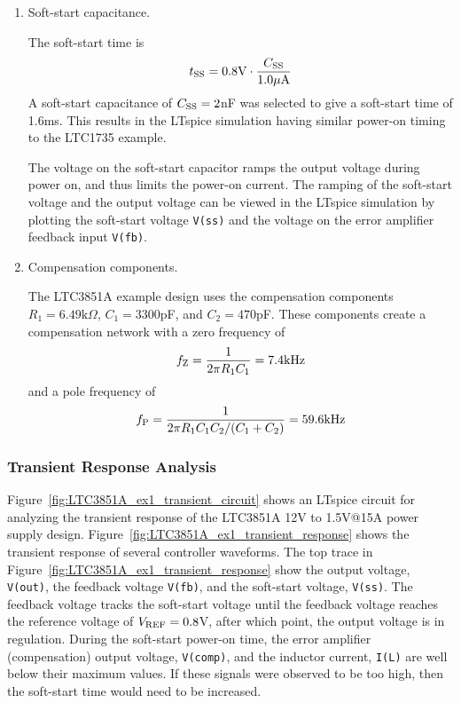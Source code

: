 \begin{enumerate}
\item Soft-start capacitance.

The soft-start time is 
%
\begin{equation}
t_{\rm SS} = 0.8\text{V}\cdot\frac{C_{\rm SS}}{1.0\mu\text{A}}
\end{equation}
%
A soft-start capacitance of $C_{\rm SS} = 2$nF was selected 
to give a soft-start time of 1.6ms. This results in the 
LTspice simulation having similar power-on timing to the
LTC1735 example.

The voltage on the soft-start capacitor ramps the output voltage
during power on, and thus limits the power-on current.
The ramping of the soft-start voltage and the output voltage
can be viewed in the LTspice simulation by plotting the
soft-start voltage \verb+V(ss)+ and the voltage on the
error amplifier feedback input \verb+V(fb)+.

\item Compensation components.

The LTC3851A example design uses the compensation components
$R_1  = 6.49\text{k}\Omega$, $C_1 = 3300$pF, and
$C_2 = 470$pF. These components create a compensation
network with a zero frequency of
%
\begin{equation}
f_{\rm Z} = \frac{1}{2\pi R_1 C_1} = 7.4\text{kHz}
\end{equation}
%
and a pole frequency of
%
\begin{equation}
f_{\rm P} = \frac{1}{2\pi R_1 C_1C_2/(C_1+C_2)}
= 59.6\text{kHz}
\end{equation}
\end{enumerate}

\clearpage
\subsubsection{Transient Response Analysis}

Figure~\ref{fig:LTC3851A_ex1_transient_circuit} shows an LTspice
circuit for analyzing the transient response of the
LTC3851A 12V to 1.5V@15A power supply design.
Figure~\ref{fig:LTC3851A_ex1_transient_response} shows the transient
response of several controller waveforms. 
The top trace in Figure~\ref{fig:LTC3851A_ex1_transient_response}
show the output voltage, \verb+V(out)+, the feedback voltage
\verb+V(fb)+, and the soft-start voltage, \verb+V(ss)+. The
feedback voltage tracks the soft-start voltage until the
feedback voltage reaches the reference voltage of 
$V_{\rm REF} = 0.8$V, after which point, the output voltage is
in regulation. During the soft-start power-on time, the
error amplifier (compensation) output voltage, \verb+V(comp)+,
and the inductor current, \verb+I(L)+ are well below their
maximum values. If these signals were observed to be too high,
then the soft-start time would need to be increased.

